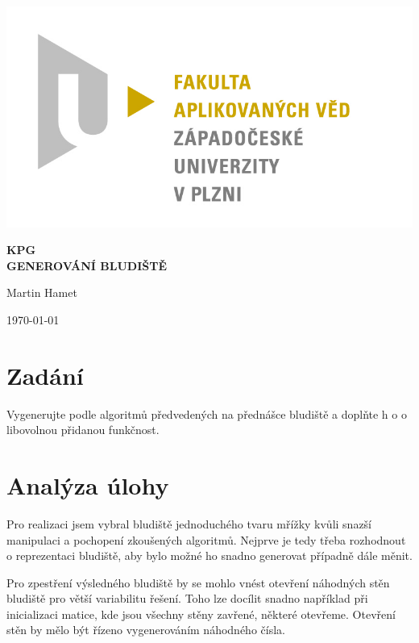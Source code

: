 \documentclass[12pt]{article}
\begin{document}
\begin{titlepage}
\includegraphics[scale=0.2, trim=5cm 0 0 30cm]{logo.jpg}
\begin{center}
\vspace{5cm}
{\Huge
\textbf{KPG}\\
\vspace{1cm}
}
{\Large
\textbf{GENEROVÁNÍ BLUDIŠTĚ}
}
\end{center}
\vspace{\fill}

\begin{minipage}[t]{5cm}
\flushleft
Martin Hamet
\end{minipage}
\hfill
\begin{minipage}[t]{7cm}
\flushright
\today
\end{minipage}
\end{titlepage}

\tableofcontents
\newpage
\section{Zadání}
Vygenerujte podle algoritmů předvedených na přednášce bludiště a doplňte h o o libovolnou přidanou funkčnost.

\section{Analýza úlohy}
Pro realizaci jsem vybral bludiště jednoduchého tvaru mřížky kvůli snazší manipulaci a pochopení zkoušených algoritmů. Nejprve je tedy třeba rozhodnout o reprezentaci bludiště, aby bylo možné ho snadno generovat případně dále měnit. 

Pro zpestření výsledného bludiště by se mohlo vnést otevření náhodných stěn bludiště pro větší variabilitu řešení. Toho lze docílit snadno například při inicializaci matice, kde jsou všechny stěny zavřené, některé otevřeme. Otevření stěn by mělo být řízeno  vygenerováním náhodného čísla. 
\end{document}
